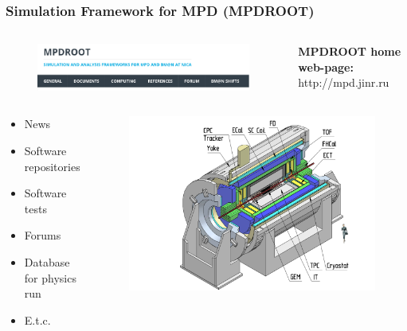 \documentclass[dvipsnames] {beamer}
\begin{document}
\begin{frame}[shrink=35]
  \bf
  \frametitle{\bf \centering Simulation Framework for MPD (MPDROOT)} 
  \begin{columns}[c]
    \begin{block}{}
      \begin{figure}[H]
        \includegraphics[width=1.\textwidth]{mpdroot_web.png}
      \end{figure}
    \end{block}
    \begin{block}{\bf \centering MPDROOT home web-page:}
      http://mpd.jinr.ru
    \end{block}
  \end{columns}
  \begin{columns}[c]
    \begin{block}{}
      \begin{itemize}
      \item News
      \item Software repositories
      \item Software tests
      \item Forums
      \item Database for physics run
      \item E.t.c.
      \end{itemize}
    \end{block}
    \begin{block}{}
      \begin{figure}[H]
        \includegraphics[width=1.\textwidth]{mpd.png}

\end{figure}
\end{block}
\end{columns}
\end{frame}
\end{document}

